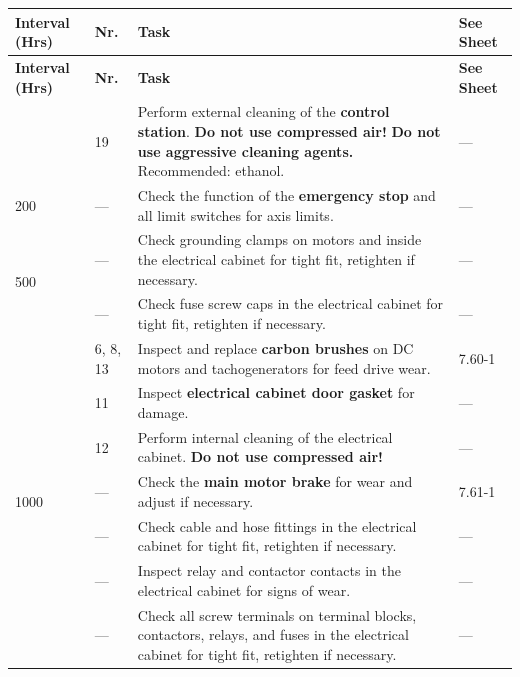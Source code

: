 \renewcommand{\arraystretch}{1.3}
\begin{longtable}{|p{1.8cm}|p{1.2cm}|p{8.5cm}|p{2cm}|}
    \hline
    \textbf{Interval (Hrs)} & \textbf{Nr.} & \textbf{Task} & \textbf{See Sheet} \\
    \hline
    \endfirsthead

    \hline
    \textbf{Interval (Hrs)} & \textbf{Nr.} & \textbf{Task} & \textbf{See Sheet} \\
    \hline
    \endhead

    \hline
    \endfoot

    \multirow{1}{*}{8} & 19 & Perform external cleaning of the \textbf{control station}.  
    \textbf{Do not use compressed air!}  
    \textbf{Do not use aggressive cleaning agents.} Recommended: ethanol. & --- \\
    \hline

    \multirow{1}{*}{200} & --- & Check the function of the \textbf{emergency stop} and all limit switches for axis limits. & --- \\
    \hline

    \multirow{2}{*}{500} & --- & Check grounding clamps on motors and inside the electrical cabinet for tight fit, retighten if necessary. & --- \\
    \cline{2-4}
    & --- & Check fuse screw caps in the electrical cabinet for tight fit, retighten if necessary. & --- \\
    \hline

    \multirow{7}{*}{1000} & 6, 8, 13 & Inspect and replace \textbf{carbon brushes} on DC motors and tachogenerators for feed drive wear. & 7.60-1 \\
    \cline{2-4}
    & 11 & Inspect \textbf{electrical cabinet door gasket} for damage. & --- \\
    \cline{2-4}
    & 12 & Perform internal cleaning of the electrical cabinet.  
    \textbf{Do not use compressed air!} & --- \\
    \cline{2-4}
    & --- & Check the \textbf{main motor brake} for wear and adjust if necessary. & 7.61-1 \\
    \cline{2-4}
    & --- & Check cable and hose fittings in the electrical cabinet for tight fit, retighten if necessary. & --- \\
    \cline{2-4}
    & --- & Inspect relay and contactor contacts in the electrical cabinet for signs of wear. & --- \\
    \cline{2-4}
    & --- & Check all screw terminals on terminal blocks, contactors, relays, and fuses in the electrical cabinet for tight fit, retighten if necessary. & --- \\
    \hline
\end{longtable}

